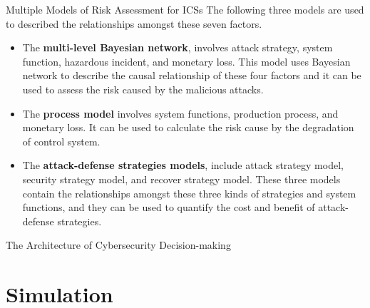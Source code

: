 \documentclass[10pt]{beamer}
\begin{document}
\begin{frame}{Multiple Models of Risk Assessment for ICSs}
The following three models are used to described the relationships amongst these seven factors.

\begin{itemize}[<+->]
  \item The \textbf{multi-level Bayesian network}, involves attack strategy, system function, hazardous incident, and monetary loss. This model uses Bayesian network to describe the causal relationship of these four factors and it can be used to assess the risk caused by the malicious attacks.
  \item The \textbf{process model} involves system functions, production process, and monetary loss. It can be used to calculate the risk cause by the degradation of control system.
  \item The \textbf{attack-defense strategies models}, include attack strategy model, security strategy model, and recover strategy model. These three models contain the relationships amongst these three kinds of strategies and system functions, and they can be used to quantify the cost and benefit of attack-defense strategies.
\end{itemize}
\end{frame}

\begin{frame}{The Architecture of Cybersecurity Decision-making}
    \resizebox{\textwidth}{!}{}
\end{frame}

\section{Simulation}
\end{document}
